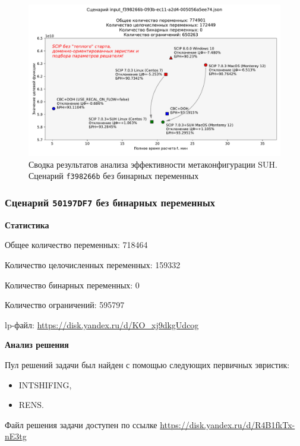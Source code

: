 \documentclass[%
	11pt,
	a4paper,
	utf8,
		]{article}
\begin{document}
\begin{figure}[!h]
	\centering
	\includegraphics[scale=0.6]{figures/summary_f398266b.pdf}
	\caption{Сводка результатов анализа эффективности метаконфигурации SUH. \\Сценарий \texttt{f398266b} без бинарных переменных}\label{fig:summary_f398266b}
\end{figure}

\subsubsection{Сценарий \texttt{50197DF7} без бинарных переменных}

\textbf{Статистика}\vspace*{1mm}

Общее количество переменных: 718464

Количество целочисленных переменных: 159332

Количество бинарных переменных: 0

Количество ограничений: 595797

lp-файл: \url{https://disk.yandex.ru/d/KO_xj9dkgUdcog}

\vspace*{5mm}\textbf{Анализ решения}\vspace*{1mm}

Пул решений задачи был найден с помощью следующих первичных эвристик:
\begin{itemize}
	\item INTSHIFING,
	
	\item RENS.
\end{itemize}

Файл решения задачи доступен по ссылке \url{https://disk.yandex.ru/d/R4B1fkTx-nE3tg}
\end{document}
